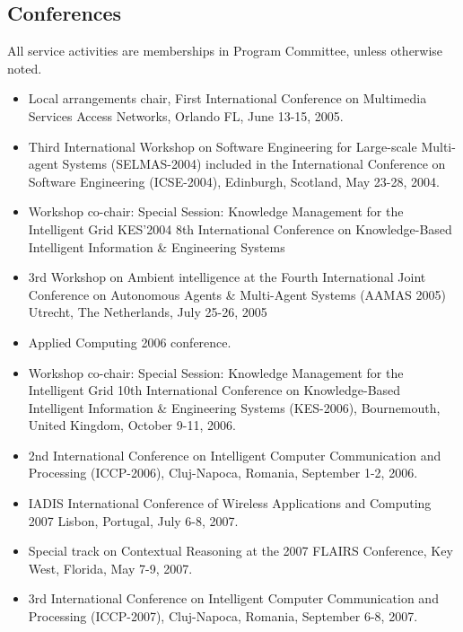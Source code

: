 \subsection*{Conferences}
    
All service activities are memberships in Program Committee, unless otherwise noted.

\begin{itemize}

\item Local arrangements chair, First International Conference on Multimedia Services Access Networks, Orlando FL, June 13-15, 2005.

\item Third International Workshop on Software Engineering for Large-scale Multi-agent Systems (SELMAS-2004) included in the International Conference on Software Engineering (ICSE-2004), Edinburgh, Scotland, May 23-28, 2004.

\item Workshop co-chair: Special Session: Knowledge Management for the Intelligent Grid KES'2004 8th International Conference on Knowledge-Based Intelligent Information \& Engineering Systems


\item 3rd Workshop on Ambient intelligence at the Fourth International Joint Conference on Autonomous Agents \& Multi-Agent Systems (AAMAS 2005) Utrecht, The Netherlands, July 25-26, 2005

\item Applied Computing 2006 conference.

\item Workshop co-chair: Special Session: Knowledge Management for the Intelligent Grid  10th International Conference on Knowledge-Based Intelligent Information \& Engineering Systems (KES-2006), Bournemouth, United Kingdom, October 9-11, 2006.

\item 2nd International Conference on Intelligent Computer Communication and Processing (ICCP-2006), Cluj-Napoca, Romania, September 1-2, 2006.

\item IADIS International Conference of Wireless Applications and Computing 2007 Lisbon, Portugal, July 6-8, 2007.

\item Special track on Contextual Reasoning at the 2007 FLAIRS Conference, Key West, Florida, May 7-9, 2007.

\item 3rd International Conference on Intelligent Computer Communication and Processing (ICCP-2007), Cluj-Napoca, Romania, September 6-8, 2007.


\end{itemize}
